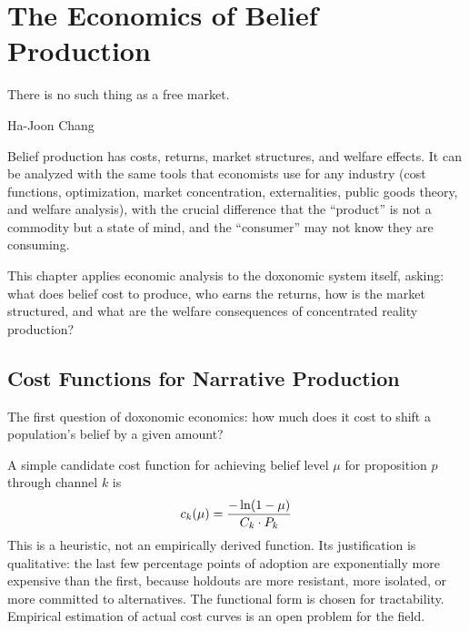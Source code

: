 \chapter{The Economics of Belief Production}
\label{ch:economics-belief}

\epigraph{There is no such thing as a free market.}{Ha-Joon Chang}

\noindent
Belief production has costs, returns, market structures, and welfare effects.
It can be analyzed with the same tools that economists use for any industry (cost functions, optimization, market concentration, externalities, public goods theory, and welfare analysis), with the crucial difference that the ``product'' is not a commodity but a state of mind, and the ``consumer'' may not know they are consuming.

This chapter applies economic analysis to the doxonomic system itself, asking: what does belief cost to produce, who earns the returns, how is the market structured, and what are the welfare consequences of concentrated reality production?


\section{Cost Functions for Narrative Production}
\label{sec:ch10-costs}

The first question of doxonomic economics: how much does it cost to shift a population's belief by a given amount?

\begin{model}
\label{mod:cost-function}
A simple candidate cost function for achieving belief level $\mu$ for proposition $p$ through channel $k$ is
\[
  c_k(\mu) = \frac{-\ln(1-\mu)}{C_{k} \cdot P_{k}}
\]
This is a heuristic, not an empirically derived function.
Its justification is qualitative: the last few percentage points of adoption are exponentially more expensive than the first, because holdouts are more resistant, more isolated, or more committed to alternatives.
The functional form is chosen for tractability.
Empirical estimation of actual cost curves is an open problem for the field.
\end{model}

